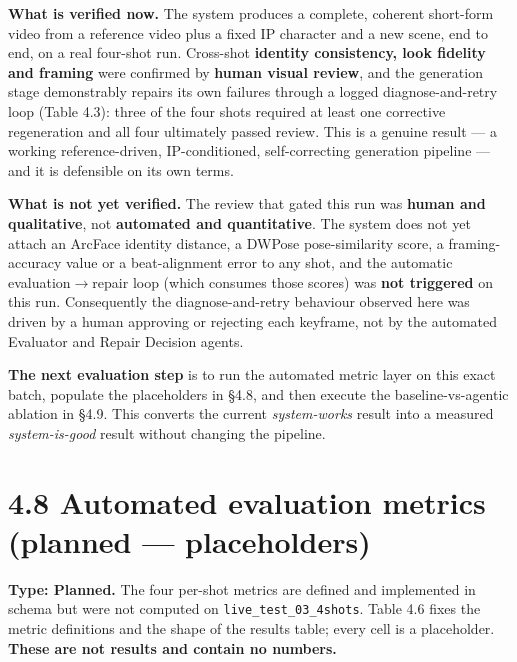 \documentclass[10pt,twocolumn,letterpaper]{article}
\begin{document}
\textbf{What is verified now.} The system produces a complete, coherent short-form video from a reference video plus a fixed IP character and a new scene, end to end, on a real four-shot run. Cross-shot \textbf{identity consistency, look fidelity and framing} were confirmed by \textbf{human visual review}, and the generation stage demonstrably repairs its own failures through a logged diagnose-and-retry loop (Table 4.3): three of the four shots required at least one corrective regeneration and all four ultimately passed review. This is a genuine result --- a working reference-driven, IP-conditioned, self-correcting generation pipeline --- and it is defensible on its own terms.

\textbf{What is not yet verified.} The review that gated this run was \textbf{human and qualitative}, not \textbf{automated and quantitative}. The system does not yet attach an ArcFace identity distance, a DWPose pose-similarity score, a framing-accuracy value or a beat-alignment error to any shot, and the automatic evaluation$\rightarrow$repair loop (which consumes those scores) was \textbf{not triggered} on this run. Consequently the diagnose-and-retry behaviour observed here was driven by a human approving or rejecting each keyframe, not by the automated Evaluator and Repair Decision agents.

\textbf{The next evaluation step} is to run the automated metric layer on this exact batch, populate the placeholders in \S{}4.8, and then execute the baseline-vs-agentic ablation in \S{}4.9. This converts the current \emph{system-works} result into a measured \emph{system-is-good} result without changing the pipeline.

\section*{4.8 Automated evaluation metrics (planned --- placeholders)}

\textbf{Type: Planned.} The four per-shot metrics are defined and implemented in schema but were not computed on \texttt{live\_test\_03\_4shots}. Table 4.6 fixes the metric definitions and the shape of the results table; every cell is a placeholder. \textbf{These are not results and contain no numbers.}
\end{document}
